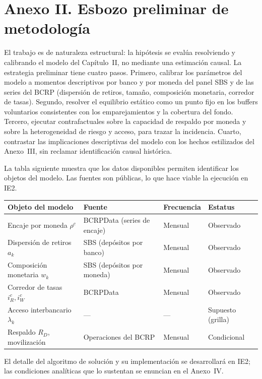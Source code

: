\documentclass[11pt,a4paper]{article}
\begin{document}
\section{Anexo II. Esbozo preliminar de metodología}\label{sec:anexo-met}
El trabajo es de naturaleza estructural: la hipótesis se evalúa resolviendo y calibrando el modelo del Capítulo~II, no mediante una estimación causal. La estrategia preliminar tiene cuatro pasos. Primero, calibrar los parámetros del modelo a momentos descriptivos por banco y por moneda del panel SBS y de las series del BCRP (dispersión de retiros, tamaño, composición monetaria, corredor de tasas). Segundo, resolver el equilibrio estático como un punto fijo en los buffers voluntarios consistentes con los emparejamientos y la cobertura del fondo. Tercero, ejecutar contrafactuales sobre la capacidad de respaldo por moneda y sobre la heterogeneidad de riesgo y acceso, para trazar la incidencia. Cuarto, contrastar las implicaciones descriptivas del modelo con los hechos estilizados del Anexo~III, sin reclamar identificación causal histórica.

La tabla siguiente muestra que los datos disponibles permiten identificar los objetos del modelo. Las fuentes son públicas, lo que hace viable la ejecución en IE2.

\renewcommand{\arraystretch}{1.25}
\noindent\begin{tabular}{@{}p{3.7cm}p{3.7cm}p{2.1cm}p{2.5cm}@{}}
\toprule
\textbf{Objeto del modelo} & \textbf{Fuente} & \textbf{Frecuencia} & \textbf{Estatus}\\
\midrule
Encaje por moneda $\rho^c$ & BCRPData (series de encaje) & Mensual & Observado\\
Dispersión de retiros $a_k$ & SBS (depósitos por banco) & Mensual & Observado\\
Composición monetaria $w_k$ & SBS (depósitos por moneda) & Mensual & Observado\\
Corredor de tasas $i^c_R,i^c_W$ & BCRPData & Mensual & Observado\\
Acceso interbancario $\lambda_k$ & --- & --- & Supuesto (grilla)\\
Respaldo $R_D$, movilización & Operaciones del BCRP & Mensual & Condicional\\
\bottomrule
\end{tabular}

\medskip
\noindent El detalle del algoritmo de solución y su implementación se desarrollará en IE2; las condiciones analíticas que lo sustentan se enuncian en el Anexo~IV.
\end{document}
